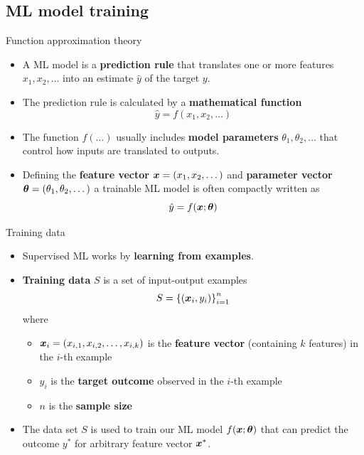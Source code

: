 \documentclass{beamer}
\begin{document}
\subsection{ML model training}

\begin{frame}{Function approximation theory}
\begin{itemize}
\item A ML model is a \textbf{prediction rule} that translates one or more features \(x_1, x_2, \dots\) into an estimate \(\hat{y}\) of the target \(y\).
\item The prediction rule is calculated by a \textbf{mathematical function} \[\hat{y} = f(x_1, x_2, \dots)\]
\item The function \(f(\dots)\) usually includes \textbf{model parameters} \(\theta_1, \theta_2, \dots\) that control how inputs are translated to outputs.
\item Defining the \textbf{feature vector} \(\boldsymbol{x} = (x_1, x_2, \dots)\) and \textbf{parameter vector} \(\boldsymbol{\theta}=(\theta_1, \theta_2, \dots)\) a trainable ML model is often compactly written as \[\hat{y} = f(\boldsymbol{x}; \boldsymbol{\theta})\]
\end{itemize}
\end{frame}


\begin{frame}{Training data}
\begin{itemize}
\item Supervised ML works by \textbf{learning from examples}.
\item \textbf{Training data} \(S\) is a set of input-output examples \[S = \left\{(\boldsymbol{x}_i, y_i)\right\}_{i=1}^n\] where
\begin{itemize}
\item \(\boldsymbol{x}_i = (x_{i,1}, x_{i,2}, \dots, x_{i,k})\) is the \textbf{feature vector} (containing \(k\) features) in the \(i\)-th example
\item \(y_i\) is the \textbf{target outcome} observed in the \(i\)-th example
\item \(n\) is the \textbf{sample size}
\end{itemize}
\item The data set \(S\) is used to train our ML model \(f(\boldsymbol{x};\boldsymbol{\theta})\) that can predict the outcome \(y^*\) for arbitrary feature vector \(\boldsymbol{x}^*\).
\end{itemize}
\end{frame}
\end{document}
